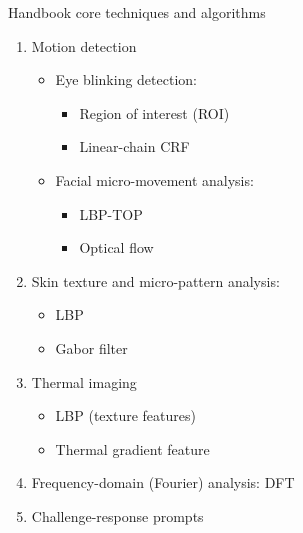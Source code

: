 \begin{frame}{Handbook core techniques and algorithms}
    \begin{enumerate}
        \item Motion detection
        \begin{itemize}
            \item Eye blinking detection:
            \begin{itemize}
                \item Region of interest (ROI)
                \item Linear-chain CRF
            \end{itemize}
            \item Facial micro-movement analysis:
                \begin{itemize}
                    \item LBP-TOP
                    \item Optical flow 
                \end{itemize} 
        \end{itemize}
        \item Skin texture and micro-pattern analysis:
            \begin{itemize}
                \item LBP
                \item Gabor filter
            \end{itemize}
        \item Thermal imaging
            \begin{itemize}
                \item LBP (texture features)
                \item Thermal gradient feature
            \end{itemize}
        \item Frequency-domain (Fourier) analysis: DFT
        \item Challenge-response prompts
    \end{enumerate}
\end{frame}


